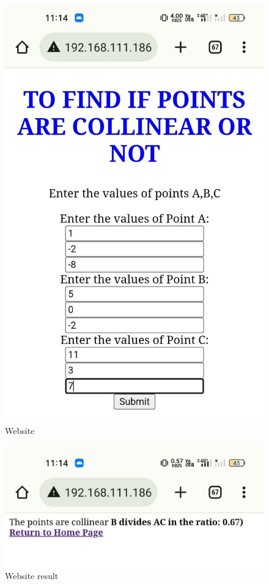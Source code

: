 \begin{enumerate}[label=\thesection.\arabic*.,ref=\thesection.\theenumi]
\begin{figure}[H]
\includegraphics[scale =0.3]{./math_using_esp/figs/1.jpg}
\caption{Website}
\label{fig:results of collinear}
\end{figure}

\begin{figure}[H]
\centering
\includegraphics[width=\columnwidth]{./math_using_esp/figs/2.jpg}
\caption{Website result}
\label{fig:results of collinear equations }
\end{figure}

\end{enumerate}


